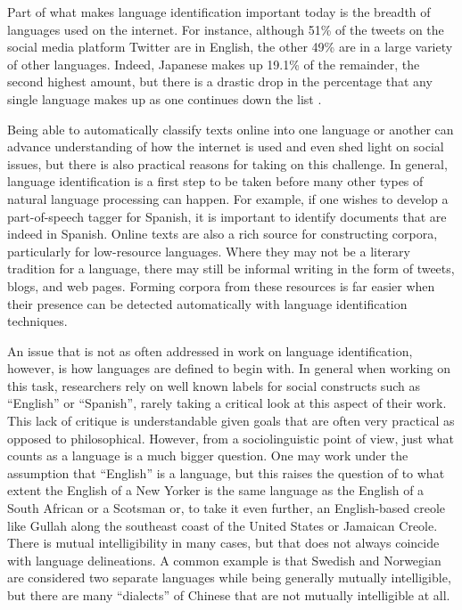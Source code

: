 \documentclass{article}
\begin{document}
    Part of what makes language identification important today is the breadth of languages used on the internet.
    For instance, although 51\% of the tweets on the social media platform Twitter are in English, the other 49\% are in a large variety of other languages.
    Indeed, Japanese makes up 19.1\% of the remainder, the second highest amount, but there is a drastic drop in the percentage that any single language makes up as one continues down the list \parencite[p.~519]{hong_language_2011}.

    Being able to automatically classify texts online into one language or another can advance understanding of how the internet is used and even shed light on social issues, but there is also practical reasons for taking on this challenge.
    In general, language identification is a first step to be taken before many other types of natural language processing can happen.
    For example, if one wishes to develop a part-of-speech tagger for Spanish, it is important to identify documents that are indeed in Spanish.
    Online texts are also a rich source for constructing corpora, particularly for low-resource languages.
    Where they may not be a literary tradition for a language, there may still be informal writing in the form of tweets, blogs, and web pages.
    Forming corpora from these resources is far easier when their presence can be detected automatically with language identification techniques.


    An issue that is not as often addressed in work on language identification, however, is how languages are defined to begin with.
    In general when working on this task, researchers rely on well known labels for social constructs such as ``English'' or ``Spanish'', rarely taking a critical look at this aspect of their work.
    This lack of critique is understandable given goals that are often very practical as opposed to philosophical.
    However, from a sociolinguistic point of view, just what counts as a language is a much bigger question.
    One may work under the assumption that ``English'' is a language, but this raises the question of to what extent the English of a New Yorker is the same language as the English of a South African or a Scotsman or, to take it even further, an English-based creole like Gullah along the southeast coast of the United States or Jamaican Creole.
    There is mutual intelligibility in many cases, but that does not always coincide with language delineations.
    A common example is that Swedish and Norwegian are considered two separate languages while being generally mutually intelligible, but there are many ``dialects'' of Chinese that are not mutually intelligible at all.
\end{document}
